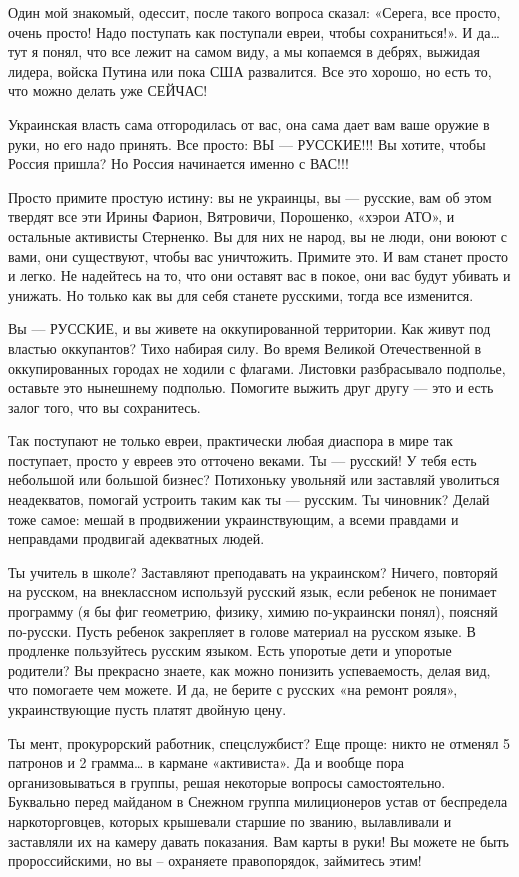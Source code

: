 Один мой знакомый, одессит, после такого вопроса сказал: «Серега, все просто,
очень просто! Надо поступать как поступали евреи, чтобы сохраниться!». И да…
тут я понял, что все лежит на самом виду, а мы копаемся в дебрях, выжидая
лидера, войска Путина или пока США развалится. Все это хорошо, но есть то, что
можно делать уже СЕЙЧАС!

Украинская власть сама отгородилась от вас, она сама дает вам ваше оружие в
руки, но его надо принять. Все просто: ВЫ --- РУССКИЕ!!! Вы хотите, чтобы
Россия пришла? Но Россия начинается именно с ВАС!!!

Просто примите простую истину: вы не украинцы, вы --- русские, вам об этом
твердят все эти Ирины Фарион, Вятровичи, Порошенко, «хэрои АТО», и остальные
активисты Стерненко. Вы для них не народ, вы не люди, они воюют с вами, они
существуют, чтобы вас уничтожить. Примите это. И вам станет просто и легко. Не
надейтесь на то, что они оставят вас в покое, они вас будут убивать и унижать.
Но только как вы для себя станете русскими, тогда все изменится.

Вы --- РУССКИЕ, и вы живете на оккупированной территории. Как живут под властью
оккупантов? Тихо набирая силу. Во время Великой Отечественной в оккупированных
городах не ходили с флагами. Листовки разбрасывало подполье, оставьте это
нынешнему подполью. Помогите выжить друг другу --- это и есть залог того, что
вы сохранитесь.

Так поступают не только евреи, практически любая диаспора в мире так поступает,
просто у евреев это отточено веками. Ты --- русский! У тебя есть небольшой или
большой бизнес? Потихоньку увольняй или заставляй уволиться неадекватов,
помогай устроить таким как ты --- русским. Ты чиновник? Делай тоже самое: мешай
в продвижении украинствующим, а всеми правдами и неправдами продвигай
адекватных людей.

Ты учитель в школе? Заставляют преподавать на украинском? Ничего, повторяй на
русском, на внеклассном используй русский язык, если ребенок не понимает
программу (я бы фиг геометрию, физику, химию по-украински понял), поясняй
по-русски. Пусть ребенок закрепляет в голове материал на русском языке. В
продленке пользуйтесь русским языком. Есть упоротые дети и упоротые родители?
Вы прекрасно знаете, как можно понизить успеваемость, делая вид, что помогаете
чем можете. И да, не берите с русских «на ремонт рояля», украинствующие пусть
платят двойную цену.

Ты мент, прокурорский работник, спецслужбист? Еще проще: никто не отменял 5
патронов и 2 грамма… в кармане «активиста». Да и вообще пора организовываться в
группы, решая некоторые вопросы самостоятельно. Буквально перед майданом в
Снежном группа милиционеров устав от беспредела наркоторговцев, которых
крышевали старшие по званию, вылавливали и заставляли их на камеру давать
показания. Вам карты в руки! Вы можете не быть пророссийскими, но вы –
охраняете правопорядок, займитесь этим!

